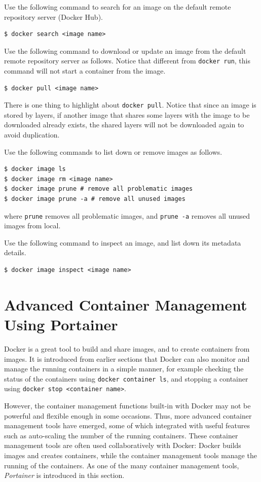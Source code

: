 Use the following command to search for an image on the default remote repository server (Docker Hub).
\begin{lstlisting}
$ docker search <image name>
\end{lstlisting}

Use the following command to download or update an image from the default remote repository server as follows. Notice that different from \verb|docker run|, this command will not start a container from the image.
\begin{lstlisting}
$ docker pull <image name>
\end{lstlisting}
There is one thing to highlight about \verb|docker pull|. Notice that since an image is stored by layers, if another image that shares some layers with the image to be downloaded already exists, the shared layers will not be downloaded again to avoid duplication.

Use the following commands to list down or remove images as follows.
\begin{lstlisting}
$ docker image ls
$ docker image rm <image name>
$ docker image prune # remove all problematic images
$ docker image prune -a # remove all unused images
\end{lstlisting}
where \verb|prune| removes all problematic images, and \verb|prune -a| removes all unused images from local.

Use the following command to inspect an image, and list down its metadata details.
\begin{lstlisting}
$ docker image inspect <image name>
\end{lstlisting}

\section{Advanced Container Management Using Portainer}

Docker is a great tool to build and share images, and to create containers from images. It is introduced from earlier sections that Docker can also monitor and manage the running containers in a simple manner, for example checking the status of the containers using \verb|docker container ls|, and stopping a container using \verb|docker stop <container name>|.

However, the container management functions built-in with Docker may not be powerful and flexible enough in some occasions. Thus, more advanced container management tools have emerged, some of which integrated with useful features such as auto-scaling the number of the running containers. These container management tools are often used collaboratively with Docker: Docker builds images and creates containers, while the container management tools manage the running of the containers. As one of the many container management tools, \textit{Portainer} is introduced in this section.

